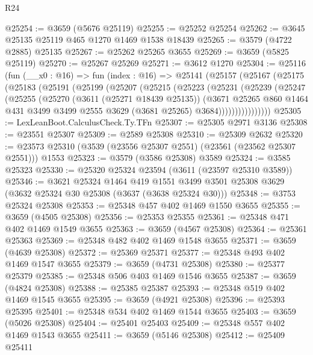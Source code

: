 \begin{lexlean}{R24}
\begin{coremodule}
@25254 := @3659 (@5676 @25119)
@25255 := @25252 @25254
@25262 := @3645 @25135 @25119 @465 @1270 @1469 @1538 @18439
@25265 := @3579 (@4722 @2885) @25135
@25267 := @25262 @25265 @3655
@25269 := @3659 (@5825 @25119)
@25270 := @25267 @25269
@25271 := @3612 @1270
@25304 := @25116
    (fun (__x0 : @16) =>
    fun (index : @16) =>
    @25141
      (@25157
        (@25167
          (@25175
            (@25183
              (@25191
                (@25199
                  (@25207
                    (@25215
                      (@25223
                        (@25231
                          (@25239
                            (@25247
                              (@25255
                                (@25270
                                  (@3611 (@25271 @18439 @25135))
                                  (@3671
                                    @25265
                                    @860
                                    @1464
                                    @431
                                    @3499
                                    @3499
                                    @2555
                                    @3629
                                    (@3681 @25265)
                                    @3684))))))))))))))))
@25305 := LexLeanBoot.CalculusCheck.Ty.TFn
@25307 := @25305 @2971 @3136
@25308 := @23551 @25307
@25309 := @2589 @25308
@25310 := @25309 @2632
@25320 := @23573 @25310 (@3539 (@23556 @25307 @2551) (@23561 (@23562 @25307 @2551))) @1553
@25323 := @3579 (@3586 @25308) @3589
@25324 := @3585 @25323
@25330 := @25320 @25324 @23594 (@3611 (@23597 @25310 @3589))
@25346 := @3621
    @25324
    @1464
    @419
    @1551
    @3499
    @3501
    @25308
    @3629
    (@3632 @25324 @30 @25308 (@3637 (@3638 @25324 @30)))
@25348 := @3753 @25324 @25308
@25353 := @25348 @457 @402 @1469 @1550 @3655
@25355 := @3659 (@4505 @25308)
@25356 := @25353 @25355
@25361 := @25348 @471 @402 @1469 @1549 @3655
@25363 := @3659 (@4567 @25308)
@25364 := @25361 @25363
@25369 := @25348 @482 @402 @1469 @1548 @3655
@25371 := @3659 (@4639 @25308)
@25372 := @25369 @25371
@25377 := @25348 @493 @402 @1469 @1547 @3655
@25379 := @3659 (@4731 @25308)
@25380 := @25377 @25379
@25385 := @25348 @506 @403 @1469 @1546 @3655
@25387 := @3659 (@4824 @25308)
@25388 := @25385 @25387
@25393 := @25348 @519 @402 @1469 @1545 @3655
@25395 := @3659 (@4921 @25308)
@25396 := @25393 @25395
@25401 := @25348 @534 @402 @1469 @1544 @3655
@25403 := @3659 (@5026 @25308)
@25404 := @25401 @25403
@25409 := @25348 @557 @402 @1469 @1543 @3655
@25411 := @3659 (@5146 @25308)
@25412 := @25409 @25411

\end{coremodule}
\end{lexlean}
